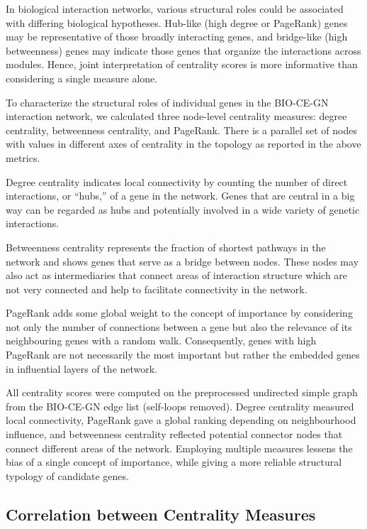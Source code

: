 In biological interaction networks, various structural roles could be associated with differing biological hypotheses. Hub-like (high degree or PageRank) genes may be representative of those broadly interacting genes, and bridge-like (high betweenness) genes may indicate those genes that organize the interactions across modules. Hence, joint interpretation of centrality scores is more informative than considering a single measure alone.

To characterize the structural roles of individual genes in the BIO-CE-GN interaction network, we calculated three node-level centrality measures: degree centrality, betweenness centrality, and PageRank. There is a parallel set of nodes with values in different axes of centrality in the topology as reported in the above metrics.

Degree centrality indicates local connectivity by counting the number of direct interactions, or “hubs,” of a gene in the network. Genes that are central in a big way can be regarded as hubs and potentially involved in a wide variety of genetic interactions.

Betweenness centrality represents the fraction of shortest pathways in the network and shows genes that serve as a bridge between nodes. These nodes may also act as intermediaries that connect areas of interaction structure which are not very connected and help to facilitate connectivity in the network.

PageRank adds some global weight to the concept of importance by considering not only the number of connections between a gene but also the relevance of its neighbouring genes with a random walk. Consequently, genes with high PageRank are not necessarily the most important but rather the embedded genes in influential layers of the network.

All centrality scores were computed on the preprocessed undirected simple graph from the BIO-CE-GN edge list (self-loops removed). Degree centrality measured local connectivity, PageRank gave a global ranking depending on neighbourhood influence, and betweenness centrality reflected potential connector nodes that connect different areas of the network. Employing multiple measures lessens the bias of a single concept of importance, while giving a more reliable structural typology of candidate genes.


\subsection{Correlation between Centrality Measures}

